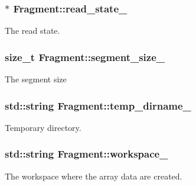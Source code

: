 \subsubsection[{read\+\_\+state\+\_\+}]{$\ast$ Fragment\+::read\+\_\+state\+\_\+\hspace{0.3cm}{\ttfamily [private]}}\label{classFragment_a526d3e88d0210c9afbc183b2f62429b0}
The read state. \hypertarget{classFragment_a18f4d5d8f97e867d8b6e54a3c922752e}{}
\subsubsection[{segment\+\_\+size\+\_\+}]{\setlength{\rightskip}{0pt plus 5cm}size\+\_\+t Fragment\+::segment\+\_\+size\+\_\+\hspace{0.3cm}{\ttfamily [private]}}\label{classFragment_a18f4d5d8f97e867d8b6e54a3c922752e}
The segment size \hypertarget{classFragment_adc5e894a8229dc1089d455706f188653}{}
\subsubsection[{temp\+\_\+dirname\+\_\+}]{\setlength{\rightskip}{0pt plus 5cm}std\+::string Fragment\+::temp\+\_\+dirname\+\_\+\hspace{0.3cm}{\ttfamily [private]}}\label{classFragment_adc5e894a8229dc1089d455706f188653}
Temporary directory. \hypertarget{classFragment_a8c66b30f81356a716125ddfa6caecb2a}{}
\subsubsection[{workspace\+\_\+}]{\setlength{\rightskip}{0pt plus 5cm}std\+::string Fragment\+::workspace\+\_\+\hspace{0.3cm}{\ttfamily [private]}}\label{classFragment_a8c66b30f81356a716125ddfa6caecb2a}
The workspace where the array data are created. \hypertarget{classFragment_a2dafed41f6f3d9f361ca735d9a38e7e6}{}

